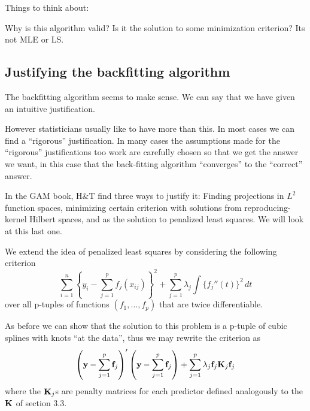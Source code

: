 Things to think about:

Why is this algorithm valid? Is it the solution to some minimization
criterion?  Its not MLE or LS. 

\subsection{Justifying the backfitting algorithm}
The backfitting algorithm seems to make sense. We can say that we have
given an intuitive justification.


However statisticians usually like to have more than this. In most
cases we can find a ``rigorous'' justification. In many cases
the assumptions made for the ``rigorous'' justifications too work are
carefully chosen so that we get the answer we want, in this case that the
back-fitting algorithm ``converges'' to the ``correct'' answer.

In the GAM book, H\&T find three ways to justify it: Finding
projections in $L^2$ function spaces, minimizing certain criterion
with solutions from reproducing-kernel Hilbert spaces, and as
the solution to penalized least squares. We will look at this last
one. 


We extend the idea of penalized least squares by considering the
following criterion 
\[
\sum_{i=1}^n \left\{ y_i - \sum_{j=1}^p f_j(x_{ij}) \right\}^2 +
  \sum_{j=1}^p \lambda_j \int \{f_j''(t)\}^2 \, dt
\]
over all p-tuples of functions $(f_1,\dots,f_p)$ that are twice
differentiable. 

As before we can show that the solution to this problem is a p-tuple
of cubic splines with knots ``at the data'', thus we may rewrite the
criterion as
\[
\left({\mathbf y} - \sum_{j=1}^p {\mathbf f}_j \right)'\left({\mathbf y} - \sum_{j=1}^p {\mathbf f}_j
\right) + \sum_{j=1}^p \lambda_j {\mathbf f}_j {\mathbf K}_j {\mathbf f}_j
\]
where the ${\mathbf K}_j$s are penalty matrices for each predictor defined
analogously to the ${\mathbf K}$ of section 3.3.

